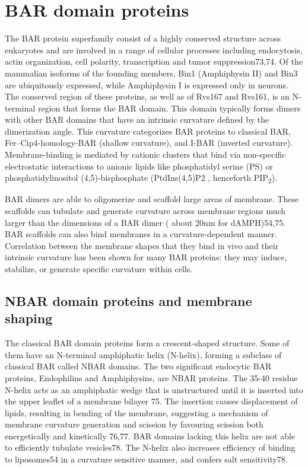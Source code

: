 		
\section{BAR domain proteins}
	
The BAR protein superfamily consist of a highly conserved structure across eukaryotes and are involved in a range of cellular processes including endocytosis, actin organization, cell polarity, transcription and tumor suppression73,74.
Of the mammalian isoforms of the founding members, Bin1 (Amphiphysin II) and Bin3 are ubiquitously expressed, while Amphiphysin I is expressed only in neurons. The conserved region of these proteins, as well as of Rvs167 and Rvs161, is an N-terminal region that forms the BAR domain. This domain typically forms dimers with other BAR domains that have an intrinsic curvature defined by the dimerization angle. This curvature categorizes BAR proteins to classical BAR, Fer–Cip4-homology-BAR (shallow curvature), and I-BAR (inverted curvature). Membrane-binding is mediated by cationic clusters that bind via non-specific electrostatic interactions to anionic lipids like phosphatidyl serine (PS) or phosphatidylinositol (4,5)-bisphosphate (PtdIns(4,5)P2 , henceforth PIP\textsubscript{2}).

\vspace{5mm}
BAR dimers are able to oligomerize and scaffold large areas of membrane. These scaffolds can tubulate and generate curvature across membrane regions much larger than the dimensions of a BAR dimer ( about 20nm for dAMPH)54,75. BAR scaffolds can also bind membranes in a curvature-dependent manner. Correlation between the membrane shapes that they bind in vivo and their intrinsic curvature has been shown for many BAR proteins: they may induce, stabilize, or generate specific curvature within cells. 


	\subsection{NBAR domain proteins and membrane shaping}	
	The classical BAR domain proteins form a crescent-shaped structure. Some of them have an N-terminal amphiphatic helix (N-helix), forming a subclass of classical BAR called NBAR domains. The two significant endocytic BAR proteins, Endophilins and Amphiphysins, are NBAR proteins. The 35-40 residue N-helix acts as an amphiphatic wedge that is unstructured until it is inserted into the upper leaflet of a membrane bilayer 75. The insertion causes displacement of lipids, resulting in bending of the membrane, suggesting a mechanism of membrane curvature generation and scission by favouring scission both energetically and kinetically 76,77. BAR domains lacking this helix are not able to efficiently tubulate vesicles78. The N-helix also increases efficiency of binding to liposomes54 in a curvature sensitive manner, and confers salt sensitivity78. 

